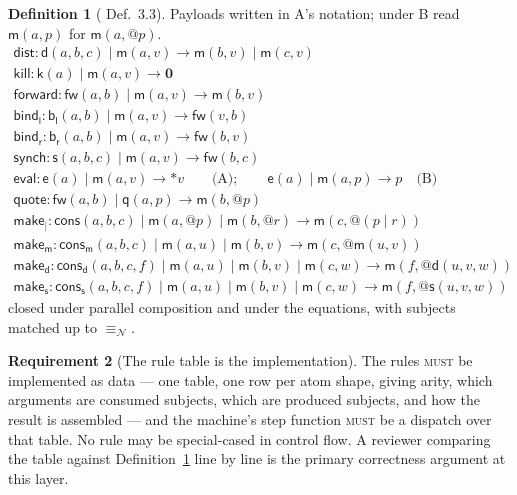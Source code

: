 \documentclass[11pt,a4paper]{article}
\makeatletter
\newcommand{\MUST}{\textsc{must}}
\newcommand{\quo}[1]{@#1}
\newcommand{\drp}[1]{{*}#1}
\newcommand{\nil}{\mathbf{0}}
\newcommand{\nequiv}{\equiv_{\mathcal{N}}}
\newcommand{\mm}{\mathsf{m}}
\newcommand{\dd}{\mathsf{d}}
\newcommand{\kk}{\mathsf{k}}
\newcommand{\fw}{\mathsf{fw}}
\newcommand{\bl}{\mathsf{b}_{\mathsf{l}}}
\newcommand{\br}{\mathsf{b}_{\mathsf{r}}}
\newcommand{\sy}{\mathsf{s}}
\newcommand{\ev}{\mathsf{e}}
\newcommand{\qq}{\mathsf{q}}
\newcommand{\cons}{\mathsf{cons}}
\newcommand{\red}{\longrightarrow}
\theoremstyle{definition}
\newtheorem{definition}{Definition}[section]
\newtheorem{requirement}[definition]{Requirement}
\theoremstyle{plain}
\makeatother
\begin{document}
\begin{definition}[\cite{draft3} Def.~3.3]\label{def:tred}
Payloads written in A's notation; under B read $\mm(a,p)$ for
$\mm(a,\quo{p})$.
\[
\begin{array}{l}
 \mathsf{dist} : \dd(a,b,c) \mid \mm(a,v) \red \mm(b,v) \mid \mm(c,v)\\
 \mathsf{kill} : \kk(a) \mid \mm(a,v) \red \nil\\
 \mathsf{forward} : \fw(a,b) \mid \mm(a,v) \red \mm(b,v)\\
 \mathsf{bind}_{\mathsf{l}} : \bl(a,b) \mid \mm(a,v) \red \fw(v,b)\\
 \mathsf{bind}_{\mathsf{r}} : \br(a,b) \mid \mm(a,v) \red \fw(b,v)\\
 \mathsf{synch} : \sy(a,b,c) \mid \mm(a,v) \red \fw(b,c)\\
 \mathsf{eval} : \ev(a) \mid \mm(a,v) \red \drp{v}
   \qquad\text{(A)};\qquad \ev(a) \mid \mm(a,p) \red p \quad\text{(B)}\\
 \mathsf{quote} : \fw(a,b) \mid \qq(a,p) \red \mm(b,\quo{p})\\
 \mathsf{make}_{\mid} : \cons(a,b,c) \mid \mm(a,\quo{p}) \mid \mm(b,\quo{r})
   \red \mm(c,\quo{(p \mid r)})\\
 \mathsf{make}_{\mm} : \cons_{\mm}(a,b,c) \mid \mm(a,u) \mid \mm(b,v)
   \red \mm(c,\quo{\mm(u,v)})\\
 \mathsf{make}_{\dd} : \cons_{\dd}(a,b,c,f) \mid \mm(a,u) \mid \mm(b,v)
   \mid \mm(c,w) \red \mm(f,\quo{\dd(u,v,w)})\\
 \mathsf{make}_{\sy} : \cons_{\sy}(a,b,c,f) \mid \mm(a,u) \mid \mm(b,v)
   \mid \mm(c,w) \red \mm(f,\quo{\sy(u,v,w)})
\end{array}
\]
closed under parallel composition and under the equations, with subjects
matched up to $\nequiv$.
\end{definition}

\begin{requirement}[The rule table is the implementation]\label{req:rules}
The rules \MUST{} be implemented as data --- one table, one row per atom
shape, giving arity, which arguments are consumed subjects, which are
produced subjects, and how the result is assembled --- and the machine's step
function \MUST{} be a dispatch over that table. No rule may be special-cased
in control flow. A reviewer comparing the table against
Definition~\ref{def:tred} line by line is the primary correctness argument at
this layer.
\end{requirement}
\end{document}
